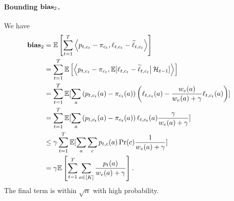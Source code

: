 \paragraph{Bounding $\mathbf{bias}_{2}$.} We have
\begin{align*}
    \mathbf{bias}_{2} &= \mathbb{E}\left[\sum_{t=1}^T \left\langle p_{t, c_t}- \pi_{c_t}, \ell_{t, c_t}-\widetilde{\ell}_{t, c_t} \right\rangle\right] \\
    &= \sum_{t=1}^T \mathbb{E}\left[ \left\langle p_{t, c_t}- \pi_{c_t}, \mathbb{E}[\ell_{t, c_t}-\widetilde{\ell}_{t, c_t} \big| \operatorname{\mathcal{H}}_{t-1}] \right\rangle \right]\\
    &= \sum_{t=1}^T \mathbb{E}[\sum_{a} \left( p_{t, c_t}(a) - \pi_{c_t}(a) \right) \left( \ell_{t, c_t}(a) - \frac{w_e(a)}{w_e(a) + \gamma} \ell_{t, c_t}(a)\right) ]\\
    &= \sum_{t=1}^T \mathbb{E}[\sum_{a} \left( p_{t, c_t}(a) - \pi_{c_t}(a) \right) \ell_{t, c_t}(a) \frac{\gamma}{w_e(a) + \gamma} ] \\
    &\le  \gamma \sum_{t=1}^T \mathbb{E}[\sum_{a} \sum_c p_{t, c}(a) \Pr(c) \frac{1}{w_e(a) + \gamma} ] \\
    &= \gamma \mathbb{E}\left[\sum_{t=1}^T\sum_{a\in[K]} \frac{p_t(a)}{w_e(a)+ \gamma} \right].
\end{align*}
The final term is within $\sqrt{\alpha}$ with high probability.

